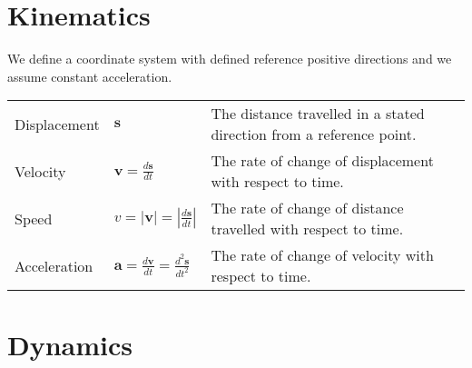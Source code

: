 \documentclass[a4paper]{article}
\begin{document}
	\section{Kinematics}
	We define a coordinate system with defined reference positive directions and we assume constant acceleration.
	\begin{center}
		\renewcommand{\arraystretch}{1.2}
		\begin{tabular}{@{} l l p{8.5cm} @{}}
			\toprule
			Displacement & $\textbf{s}$ & The distance travelled in a stated direction from a reference point. \\
			Velocity & $\displaystyle \textbf{v} = \frac{d\textbf{s}}{dt}$ & The rate of change of displacement with respect to time.\\
			\rule{0pt}{20pt}Speed & $\displaystyle v=\left|\textbf{v}\right| = \left|\frac{d\textbf{s}}{dt}\right|$ & The rate of change of distance travelled with respect to time. \\
			\rule{0pt}{20pt}Acceleration &  $\displaystyle \textbf{a} = \frac{d\textbf{v}}{dt} = \frac{d^2\textbf{s}}{dt^2}$ & The rate of change of velocity with respect to time. \\
			\bottomrule
		\end{tabular}
	\end{center}
	
	\section{Dynamics}
\end{document}
